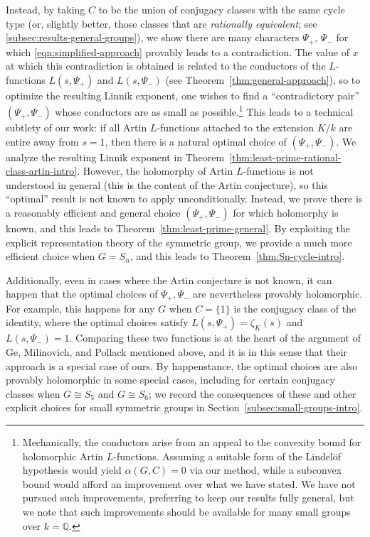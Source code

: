 \documentclass[12pt]{amsart}
\theoremstyle{definition} \newtheorem{definition}[theorem]{Definition}
\theoremstyle{example} \newtheorem{example}[theorem]{Example}
\theoremstyle{remark} \newtheorem{remark}{Remark}[theorem]
\numberwithin{equation}{section}
\numberwithin{theorem}{section}
\begin{document}
	Instead, by taking $C$ to be the union of conjugacy classes with the same cycle type (or, slightly better, those classes that are \emph{rationally equivalent}; see \cref{subsec:results-general-groups}), we show there are many characters $\Psi_+$, $\Psi_-$ for which \eqref{eqn:simplified-approach} provably leads to a contradiction.  The value of $x$ at which this contradiction is obtained is related to the conductors of the $L$-functions $L(s,\Psi_+)$ and $L(s,\Psi_-)$ (see Theorem~\ref{thm:general-approach}), so to optimize the resulting Linnik exponent, one wishes to find a ``contradictory pair'' $(\Psi_+,\Psi_-)$ whose conductors are as small as possible.\footnote{Mechanically, the conductors arise from an appeal to the convexity bound for holomorphic Artin $L$-functions.  Assuming a suitable form of the Lindel\"of hypothesis would yield $\alpha(G,C) = 0$ via our method, while a subconvex bound would afford an improvement over what we have stated.  We have not pursued such improvements, preferring to keep our results fully general, but we note that such improvements should be available for many small groups over $k=\mathbb{Q}$.}  This leads to a technical subtlety of our work: if all Artin $L$-functions attached to the extension $K/k$ are entire away from $s=1$, then there is a natural optimal choice of $(\Psi_+,\Psi_-)$.  We analyze the resulting Linnik exponent in Theorem~\ref{thm:least-prime-rational-class-artin-intro}.  However, the holomorphy of Artin $L$-functions is not understood in general (this is the content of the Artin conjecture), so this ``optimal'' result is not known to apply unconditionally.  Instead, we prove there is a reasonably efficient and general choice $(\Psi_+,\Psi_-)$ for which holomorphy is known, and this leads to Theorem~\ref{thm:least-prime-general}.  By exploiting the explicit representation theory of the symmetric group, we provide a much more efficient choice when $G=S_n$, and this leads to Theorem~\ref{thm:Sn-cycle-intro}.  
	
	Additionally, even in cases where the Artin conjecture is not known, it can happen that the optimal choices of $\Psi_+,\Psi_-$ are nevertheless provably holomorphic.  For example, this happens for any $G$ when $C=\{1\}$ is the conjugacy class of the identity, where the optimal choices satisfy $L(s,\Psi_+) = \zeta_K(s)$ and $L(s,\Psi_-) = 1$. Comparing these two functions is at the heart of the argument of Ge, Milinovich, and Pollack \cite{GeMilinovichPollack-Split} mentioned above, and it is in this sense that their approach is a special case of ours.  By happenstance, the optimal choices are also provably holomorphic in some special cases, including for certain conjugacy classes when $G\cong S_5$ and $G \cong S_6$; we record the consequences of these and other explicit choices for small symmetric groups in Section~\ref{subsec:small-groups-intro}.
	
\end{document}
